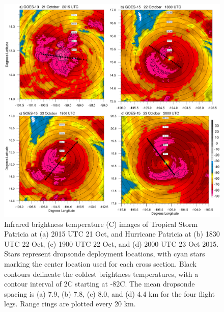 \begin{figure}[ht]
\centerline{\includegraphics[width=39pc]{figures/fig01_patricia_ir.png}}
\caption{Infrared brightness temperature (\textdegree{}C) images of Tropical Storm Patricia at (a) 2015 UTC 21 Oct, and Hurricane Patricia at (b) 1830 UTC 22 Oct, (c) 1900 UTC 22 Oct, and (d) 2000 UTC 23 Oct 2015. Stars represent dropsonde deployment locations, with cyan stars marking the center location used for each cross section. Black contours delineate the coldest brightness temperatures, with a contour interval of 2\textdegree{}C starting at -82\textdegree{}C. The mean dropsonde spacing is (a) 7.9, (b) 7.8, (c) 8.0, and (d) 4.4 km for the four flight legs. Range rings are plotted every 20 km.}
\label{fig:patricia_ir}
\end{figure}
